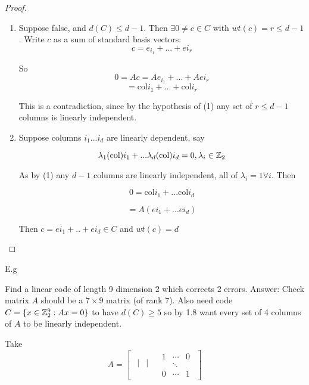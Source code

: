 \documentclass[]{amsart}
\theoremstyle{definition}
\theoremstyle{remark}
\numberwithin{equation}{section}
\begin{document}
\begin{proof}
\begin{enumerate}
	\item\par Suppose false, and $d(C) \leq d-1$. Then $\exists 0 \neq c \in C$ with $wt(c) = r \leq d-1$. Write $c$ as a sum of standard basis vectors: 
	\[
		c = e_{i_1} + ... + e{i_r}
	\]

	So \[
		0 = Ac = Ae_{i_1} + ... + Ae{i_r} 
	\]
	\[
		= \text{col}i_1 + ... + \text{col}i_r
	\]

	This is a contradiction, since by the hypothesis of (1) any set of $r \leq d-1$ columns is linearly independent.

	\item\par 
	Suppose columns $i_1 ... i_d$ are linearly dependent, say

	\[
		\lambda_1 (\text{col})i_1 + ... \lambda_d(\text{col})i_d = 0, \lambda_i \in \mathbb{Z}_2
	\]

	As by (1) any $d-1$ columns are linearly independent, all of $\lambda_i = 1 \forall i$. Then 

	\[
		0 = \text{col}i_1 + ... \text{col}i_d
	\]

	\[
		= A(e{i_1} + ... e{i_d})
	\]

	Then $c = e{i_1} + .. + e{i_d} \in C$ and $wt(c) = d$
\end{enumerate}
\end{proof}

E.g

	Find a linear code of length 9 dimension 2 which corrects 2 errors.
	Answer:
	Check matrix $A$ should be a $7 \times 9$ matrix (of rank 7). 
	Also need code $C = \{x \in \mathbb{Z}_2^9: Ax = 0\}$ to have $d(C)\geq 5$ so by 1.8 want every set of 4 columns of $A$ to be linearly independent.

	Take
	\begin{equation*}
		A = \begin{bmatrix}
			\begin{matrix}
			| & | & \\
			\end{matrix}

			\begin{matrix}
			1 & \cdots & 0 \\
			  & \ddots & \\
			0 & \cdots & 1
			\end{matrix}
			\end{bmatrix}
	\end{equation*}
\end{document}
